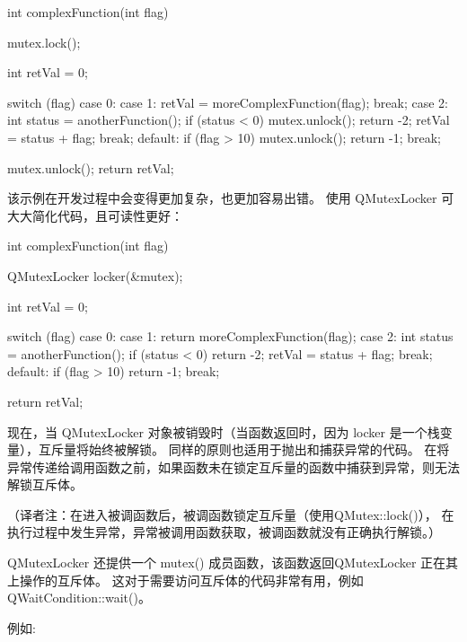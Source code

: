 \begin{cppcode}
    int complexFunction(int flag)
    {
        mutex.lock();

        int retVal = 0;

        switch (flag) {
        case 0:
        case 1:
            retVal = moreComplexFunction(flag);
            break;
        case 2:
            {
                int status = anotherFunction();
                if (status < 0) {
                    mutex.unlock();
                    return -2;
                }
                retVal = status + flag;
            }
            break;
        default:
            if (flag > 10) {
                mutex.unlock();
                return -1;
            }
            break;
        }

        mutex.unlock();
        return retVal;
    }
\end{cppcode}

该示例在开发过程中会变得更加复杂，也更加容易出错。 
使用 QMutexLocker 可大大简化代码，且可读性更好：

\begin{cppcode}
    int complexFunction(int flag)
    {
        QMutexLocker locker(&mutex);

        int retVal = 0;

        switch (flag) {
        case 0:
        case 1:
            return moreComplexFunction(flag);
        case 2:
            {
                int status = anotherFunction();
                if (status < 0)
                    return -2;
                retVal = status + flag;
            }
            break;
        default:
            if (flag > 10)
                return -1;
            break;
        }

        return retVal;
    }
\end{cppcode}

现在，当 QMutexLocker 对象被销毁时（当函数返回时，因为 locker 是一个栈变量），互斥量将始终被解锁。
同样的原则也适用于抛出和捕获异常的代码。
在将异常传递给调用函数之前，如果函数未在锁定互斥量的函数中捕获到异常，则无法解锁互斥体。

（译者注：在进入被调函数后，被调函数锁定互斥量（使用QMutex::lock()），
在执行过程中发生异常，异常被调用函数获取，被调函数就没有正确执行解锁。）

QMutexLocker 还提供一个 mutex() 成员函数，该函数返回QMutexLocker 正在其上操作的互斥体。
这对于需要访问互斥体的代码非常有用，例如 QWaitCondition::wait()。

例如:

